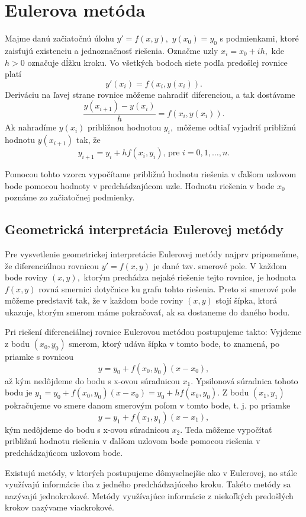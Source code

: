 \section{Eulerova metóda}
Majme danú začiatočnú úlohu $y'=f(x,y),$  $y(x_0)=y_0$ s podmienkami, ktoré zaisťujú existenciu a jednoznačnosť riešenia. Označme uzly $x_i = x_{0} + ih,$ kde $h > 0$ označuje dĺžku kroku. Vo všetkých bodoch siete podľa predošlej rovnice platí $$y'(x_i)=f(x_i,y(x_i)).$$
Deriváciu na ľavej strane rovnice môžeme nahradiť diferenciou, a tak dostávame
$$\dfrac{y(x_{i+1}) - y(x_i)}{h} = f(x_i, y(x_i)).$$
Ak nahradíme $y(x_i)$ približnou hodnotou $y_i,$ môžeme odtiaľ vyjadriť približnú hodnotu $y(x_{i+1})$ tak, že
$$y_{i+1}= y_{i}+ hf(x_i, y_i) \text{, pre } i=0,1,\dots, n.$$

Pomocou tohto vzorca vypočítame približnú hodnotu riešenia v ďalšom uzlovom bode pomocou hodnoty v predchádzajúcom uzle. Hodnotu riešenia v bode $x_0$ poznáme zo začiatočnej podmienky.

\subsection{Geometrická interpretácia Eulerovej metódy}
Pre vysvetlenie geometrickej interpretácie Eulerovej metódy najprv pripomeňme, že diferenciálnou rovnicou $y'=f(x,y)$ je dané tzv. smerové pole. V každom bode roviny $(x,y),$ ktorým prechádza nejaké riešenie tejto rovnice, je hodnota $f(x,y)$ rovná smernici dotyčnice ku grafu tohto riešenia. Preto si smerové pole môžeme predstaviť tak, že v každom bode roviny $(x,y)$ stojí šípka, ktorá ukazuje, ktorým smerom máme pokračovať, ak sa dostaneme do daného bodu.

Pri riešení diferenciálnej rovnice Eulerovou metódou postupujeme takto:
Vyjdeme z bodu $(x_0, y_0)$ smerom, ktorý udáva šípka v tomto bode, to znamená, po priamke s rovnicou $$y = y_0 + f(x_0, y_0)(x-x_0),$$ až kým nedôjdeme do bodu s x-ovou súradnicou $x_1.$ Ypsilonová súradnica tohoto bodu je $y_1 = y_0 + f(x_0, y_0)(x-x_0)=y_0+hf(x_0,y_0).$ Z bodu $(x_1,y_1)$ pokračujeme vo smere danom smerovým poľom v tomto bode, t. j. po priamke $$y = y_1 + f(x_1, y_1)(x-x_1),$$ kým nedôjdeme do bodu s x-ovou súradnicou $x_2$. Teda môžeme vypočítať približnú hodnotu riešenia v ďalšom uzlovom bode pomocou riešenia v predchádzajúcom uzlovom bode. 

Existujú metódy, v ktorých postupujeme dômyselnejšie ako v Eulerovej, no stále využívajú informácie iba z jedného predchádzajúceho kroku. Takéto metódy sa nazývajú jednokrokové. Metódy využívajúce informácie z niekoľkých predošlých krokov nazývame viackrokové.

